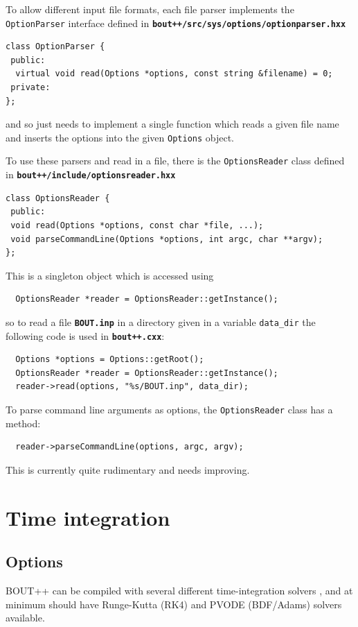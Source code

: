\documentclass[12pt]{article}
\newcommand{\file}[1]{\texttt{\bf #1}}
\begin{document}
To allow different input file formats, each file parser implements
the \lstinline!OptionParser! interface defined in
\file{bout++/src/sys/options/optionparser.hxx}
\begin{lstlisting}
class OptionParser {
 public:
  virtual void read(Options *options, const string &filename) = 0;
 private:
};
\end{lstlisting}
and so just needs to implement a single function which reads a
given file name and inserts the options into the given \lstinline!Options!
object.

To use these parsers and read in a file, there is the
\lstinline!OptionsReader! class defined in
\file{bout++/include/optionsreader.hxx} 
\begin{lstlisting}
class OptionsReader {
 public:
 void read(Options *options, const char *file, ...);
 void parseCommandLine(Options *options, int argc, char **argv);
};
\end{lstlisting}
This is a singleton object which is accessed using
\begin{lstlisting}
  OptionsReader *reader = OptionsReader::getInstance();
\end{lstlisting}
so to read a file \file{BOUT.inp} in a directory given in a variable
\lstinline!data_dir! the following code is used in \file{bout++.cxx}:
\begin{lstlisting}
  Options *options = Options::getRoot();
  OptionsReader *reader = OptionsReader::getInstance();
  reader->read(options, "%s/BOUT.inp", data_dir);
\end{lstlisting}

To parse command line arguments as options, the \lstinline!OptionsReader!
class has a method:
\begin{lstlisting}
  reader->parseCommandLine(options, argc, argv);
\end{lstlisting}
This is currently quite rudimentary and needs improving.

\section{Time integration}

\subsection{Options}
\label{sec:timeoptions}
BOUT++ can be compiled with several different time-integration solvers
,
and at minimum should have Runge-Kutta (RK4) and PVODE (BDF/Adams) solvers available.
\end{document}
